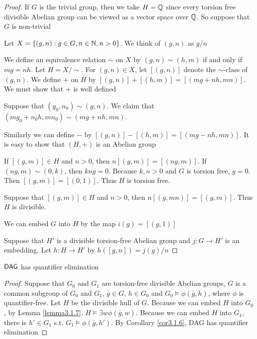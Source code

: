 \documentclass[11pt]{article}
\begin{document}
\begin{proof}
If \(G\) is the trivial group, then we take \(H=\mathbb{Q}\) since every torsion
free divisible Abelian group can be viewed as a vector space over \(\mathbb{Q}\). So
suppose that \(G\) is non-trivial

Let \(X=\{(g,n):g\in G,n\in\mathbb{N},n>0\}\). We think of \((g,n)\) as \(g/n\)

We define an equivalence relation \(\sim\) on \(X\) by \((g,n)\sim(h,m)\) if and
only if \(mg=nh\). Let \(H=X/\sim\). For \((g,n)\in X\), let \([(g,n)]\) denote
the \(\sim\)-class of \((g,n)\). We define \(+\) on \(H\) by
\([(g,n)]+[(h,m)]=[(mg+nh,mn)]\). We must show that \(+\) is well defined

Suppose that \((g_0,n_0)\sim(g,n)\). We claim that
\((mg_0+n_0h,mn_0)\sim(mg+nh,mn)\).

Similarly we can define \(-\) by \([(g,n)]-[(h,m)]=[(mg-nh,mn)]\). It is
easy to show that \((H,+)\) is an Abelian group

If \([(g,m)]\in H\) and \(n>0\), then \(n[(g,m)]=[(ng,m)]\). If
\((ng,m)\sim(0,k)\), then \(kng=0\). Because \(k,n>0\) and \(G\) is torsion
free, \(g=0\). Then \([(g,m)]=[(0,1)]\). Thus \(H\) is torsion free.

Suppose that \([(g,m)]\in H\) and \(n>0\), then \(n[(g,mn)]=[(g,m)]\). Thus
\(H\) is divisible.

We can embed \(G\) into \(H\) by the map \(i(g)=[(g,1)]\)

Suppose that \(H'\) is a divisible torsion-free Abelian group and
\(j:G\to H'\) is an embedding. Let \(h:H\to H'\) by \(h([g,n])=j(g)/n\)
\end{proof}

\begin{theorem}[]
\label{thm3.1.9}
\(\operatorname{\textsf{DAG}}\) has quantifier elimination
\end{theorem}

\begin{proof}
Suppose that \(G_0\) and \(G_1\) are torsion-free divisible Abelian groups,
\(G\) is a common subgroup of \(G_0\) and \(G_1\), \(\bar{g}\in G\),
\(h\in G_0\) and \(G_0\vDash\phi(\bar{g},h)\), where \(\phi\) is quantifier-free.
Let \(H\) be the divisible hull of \(G\). Because we can embed \(H\) into
\(G_0\), by Lemma \ref{lemma3.1.7}, \(H\vDash\exists w\phi(\bar{g},w)\). Because
we can embed \(H\) into \(G_1\), there is \(h'\in G_1\) s.t.
\(G_1\vDash\phi(\bar{g},h')\). By Corollary \ref{cor3.1.6}, DAG has
quantifier elimination
\end{proof}
\end{document}
